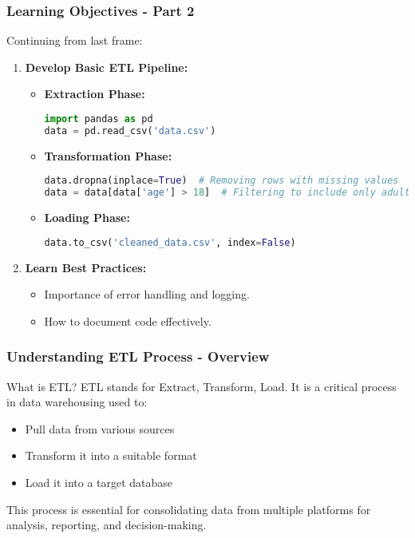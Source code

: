 \documentclass[aspectratio=169]{beamer}
\begin{document}
\begin{frame}[fragile]
    \frametitle{Learning Objectives - Part 2}
    Continuing from last frame:
    \begin{enumerate}[resume]
        \item \textbf{Develop Basic ETL Pipeline:}
        \begin{itemize}
            \item \textbf{Extraction Phase:}
            \begin{lstlisting}[language=Python]
import pandas as pd
data = pd.read_csv('data.csv')
            \end{lstlisting}
            \item \textbf{Transformation Phase:}
            \begin{lstlisting}[language=Python]
data.dropna(inplace=True)  # Removing rows with missing values
data = data[data['age'] > 18]  # Filtering to include only adults
            \end{lstlisting}
            \item \textbf{Loading Phase:}
            \begin{lstlisting}[language=Python]
data.to_csv('cleaned_data.csv', index=False)
            \end{lstlisting}
        \end{itemize}

        \item \textbf{Learn Best Practices:}
        \begin{itemize}
            \item Importance of error handling and logging.
            \item How to document code effectively.
        \end{itemize}
    \end{enumerate}
\end{frame}

\begin{frame}[fragile]
    \frametitle{Understanding ETL Process - Overview}
    \begin{block}{What is ETL?}
        ETL stands for Extract, Transform, Load. It is a critical process in data warehousing used to:
        \begin{itemize}
            \item Pull data from various sources
            \item Transform it into a suitable format
            \item Load it into a target database
        \end{itemize}
        This process is essential for consolidating data from multiple platforms for analysis, reporting, and decision-making.
    \end{block}
\end{frame}
\end{document}
